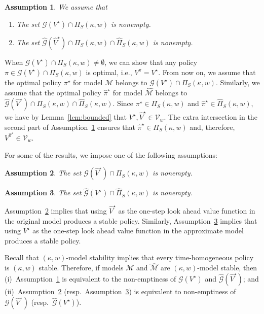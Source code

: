 \documentclass[letterpaper, 10pt]{IEEEtran}
\newtheorem{assumption}{Assumption}
\newcommand*\ALPHABET{\mathcal}
\newcommand*\tuple{\kappa, w}
\begin{document}
\begin{assumption}\label{assm:stability}
We assume that
\begin{enumerate}
    \item The set $\ALPHABET G(V^\star) \cap \Pi_S(\tuple)$ is nonempty.
    \item The set $\hat {\ALPHABET G}(\hat V^\star)\cap \Pi_S(\tuple) \cap \hat \Pi_S(\tuple)$ is nonempty.
\end{enumerate}
\end{assumption}
When $\ALPHABET G(V^\star) \cap \Pi_S(\tuple) \neq \emptyset$, we can show that any policy $\pi \in \ALPHABET G(V^\star) \cap \Pi_S(\tuple)$ is optimal, i.e., $V^{\pi} = V^\star$. 
From now on, we assume that the optimal policy $\pi^\star$ for model $\ALPHABET M$ belongs to $\ALPHABET G(V^\star) \cap \Pi_S(\tuple)$. Similarly, we assume that the optimal policy $\hat \pi^\star$ for model $\hat {\ALPHABET M}$ belongs to $\hat {\ALPHABET G}(\hat V^\star)\cap \Pi_S(\tuple) \cap \hat \Pi_S(\tuple)$. Since $\pi^\star \in \Pi_S(\tuple)$ and $\hat \pi^\star \in \hat \Pi_S(\tuple)$, we have by Lemma~\ref{lem:bounded} that $V^\star, \hat V^\star \in \ALPHABET V_w$. The extra intersection in the second part of Assumption~\ref{assm:stability} ensures that $\hat \pi^\star \in \Pi_S(\tuple)$ and, therefore, $V^{\hat \pi^\star} \in \ALPHABET V_w$. 

For some of the results, we impose one of the following assumptions:
\begin{assumption}\label{ass:N1}
    The set $\ALPHABET G(\hat V^\star) \cap  \Pi_S(\tuple)$ is nonempty.
\end{assumption}
\begin{assumption}\label{ass:N2}
    The set $\hat {\ALPHABET G}(V^\star) \cap  \hat \Pi_S(\tuple)$ is nonempty.
\end{assumption}

Assumption~\ref{ass:N1} implies that using $\hat V^\star$ as the one-step look ahead value function in the original model produces a stable policy.  Similarly, Assumption~\ref{ass:N2} implies that using $V^\star$ as the one-step look ahead value function in the approximate model produces a stable policy. 

Recall that $(\tuple)$-model stability implies that every time-homogeneous policy is $(\tuple)$ stable. Therefore, if models $\ALPHABET M$ and $\hat {\ALPHABET M}$ are $(\tuple)$-model stable, then (i)~Assumption~\ref{assm:stability} is equivalent to the non-emptiness of $\ALPHABET G(V^\star)$ and $\hat {\ALPHABET G}(\hat V^\star)$; and (ii)~Assumption~\ref{ass:N1} (resp.\ Assumption~\ref{ass:N2}) is equivalent to non-emptiness of $\ALPHABET G(\hat V^\star)$ (resp.\ $\hat {\ALPHABET G}(V^\star)$).
\end{document}
